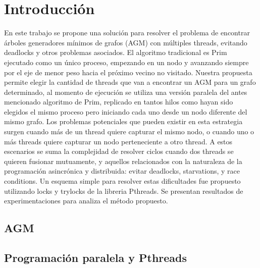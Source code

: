 \section{Introducción}
En este trabajo se propone una solución para resolver el problema de encontrar árboles generadores mínimos de grafos (AGM) con múltiples threads, evitando deadlocks y otros problemas asociados. El algoritmo tradicional es Prim ejecutado como un único proceso, empezando en un nodo y avanzando siempre por el eje de menor peso hacia el próximo vecino no visitado. Nuestra propuesta permite elegir la cantidad de threads que van a encontrar un AGM para un grafo determinado, al momento de ejecución se utiliza una versión paralela del antes mencionado algoritmo de Prim, replicado en tantos hilos como hayan sido elegidos el mismo proceso pero iniciando cada uno desde un nodo diferente del mismo grafo. Los problemas potenciales que pueden existir en esta estrategia surgen cuando más de un thread quiere capturar el mismo nodo, o cuando uno o más threads quiere capturar un nodo perteneciente a otro thread. A estos escenarios se suma la complejidad de resolver ciclos cuando dos threads se quieren fusionar mutuamente, y aquellos relacionados con la naturaleza de la programación asincrónica y distribuida: evitar deadlocks, starvations, y race conditions. Un esquema simple para resolver estas dificultades fue propuesto utilizando locks y trylocks de la libreria Pthreads. Se presentan resultados de experimentaciones para analiza el método propuesto.

\subsection{AGM}

\subsection{Programación paralela y Pthreads}

